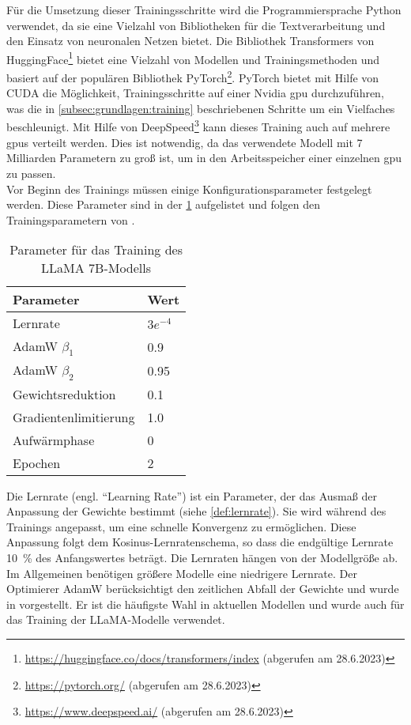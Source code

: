 Für die Umsetzung dieser Trainingsschritte wird die Programmiersprache Python verwendet, da sie eine Vielzahl von Bibliotheken für die Textverarbeitung und den Einsatz von neuronalen Netzen bietet.
Die Bibliothek Transformers von HuggingFace\footnote{\url{https://huggingface.co/docs/transformers/index} (abgerufen am 28.6.2023)} bietet eine Vielzahl von Modellen und Trainingsmethoden und basiert auf der populären Bibliothek PyTorch\footnote{\url{https://pytorch.org/} (abgerufen am 28.6.2023)}.
PyTorch bietet mit Hilfe von CUDA die Möglichkeit, Trainingsschritte auf einer Nvidia \ac{gpu} durchzuführen, was die in \cref{subsec:grundlagen:training} beschriebenen Schritte um ein Vielfaches beschleunigt.
Mit Hilfe von DeepSpeed\footnote{\url{https://www.deepspeed.ai/} (abgerufen am 28.6.2023)} kann dieses Training auch auf mehrere \ac{gpu}s verteilt werden.
Dies ist notwendig, da das verwendete Modell mit 7 Milliarden Parametern zu groß ist, um in den Arbeitsspeicher einer einzelnen \ac{gpu} zu passen.\\

Vor Beginn des Trainings müssen einige Konfigurationsparameter festgelegt werden.
Diese Parameter sind in der \cref{tab:training:parameter} aufgelistet und folgen den Trainingsparametern von \citet{llama}.\\
\begin{table}
    \centering
    \begin{tabular}{ll}
        \toprule
        \textbf{Parameter} & \textbf{Wert} \\
        \midrule
        Lernrate & $3e^{-4}$\\
        AdamW $\beta_1$ & \SI{0,9}{}\\
        AdamW $\beta_2$ & \SI{0,95}{}\\
        Gewichtsreduktion & \SI{0,1}{}\\
        Gradientenlimitierung & \SI{1,0}{}\\
        Aufwärmphase & \SI{0}{}\\
        Epochen & \SI{2}{}\\
        \bottomrule
    \end{tabular}
    \caption{Parameter für das Training des LLaMA 7B-Modells}\label{tab:training:parameter}
\end{table}

Die Lernrate (engl. \enquote{Learning Rate}) ist ein Parameter, der das Ausmaß der Anpassung der Gewichte bestimmt (siehe \cref{def:lernrate}).
Sie wird während des Trainings angepasst, um eine schnelle Konvergenz zu ermöglichen.
Diese Anpassung folgt dem Kosinus-Lernratenschema, so dass die endgültige Lernrate \SI{10}{\percent} des Anfangswertes beträgt.
Die Lernraten hängen von der Modellgröße ab.
Im Allgemeinen benötigen größere Modelle eine niedrigere Lernrate.
Der Optimierer AdamW berücksichtigt den zeitlichen Abfall der Gewichte und wurde in \citet{adamw} vorgestellt.
Er ist die häufigste Wahl in aktuellen Modellen und wurde auch für das Training der LLaMA-Modelle verwendet.\\

